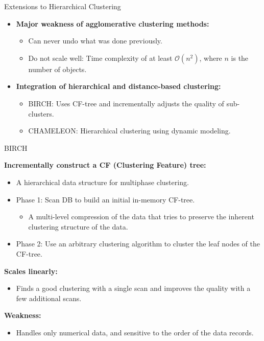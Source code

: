 \begin{frame}{Extensions to Hierarchical Clustering}
	\begin{itemize}
		\item \textbf{Major weakness of agglomerative clustering methods:}
		      \begin{itemize}
			      \item Can never undo what was done previously.
			      \item Do not scale well: Time complexity of at least
			            $\mathcal{O}(n^2)$, where $n$ is the number of objects.
		      \end{itemize}
		\item \textbf{Integration of hierarchical and distance-based
			      clustering:}
		      \begin{itemize}
			      \item BIRCH: Uses CF-tree and incrementally adjusts the
			            quality of sub-clusters.
			      \item CHAMELEON: Hierarchical clustering using dynamic
			            modeling.
		      \end{itemize}
	\end{itemize}
\end{frame}

\begin{frame}{BIRCH}

	\textbf{Incrementally construct a CF (Clustering Feature) tree:}
	\begin{itemize}
		\item A hierarchical data structure for multiphase clustering.
		\item Phase 1: Scan DB to build an initial in-memory CF-tree.
		      \begin{itemize}
			      \item A multi-level compression of the data that tries to
			            preserve the inherent clustering structure of the data.
		      \end{itemize}
		\item Phase 2: Use an arbitrary clustering algorithm to cluster the
		      leaf nodes of the CF-tree.
	\end{itemize}
	\textbf{Scales linearly:}
	\begin{itemize}
		\item Finds a good clustering with a single scan and improves the
		      quality with a few additional scans.
	\end{itemize}
	\textbf{Weakness:}
	\begin{itemize}
		\item Handles only numerical data, and sensitive to the order of
		      the data records.
	\end{itemize}
\end{frame}

